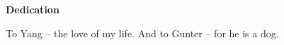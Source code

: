 {}
\begin{center}
  \textbf{Dedication}

  To Yang -- the love of my life.
  And to Gunter -- for he is a dog.
\end{center}

\cleardoublepage
